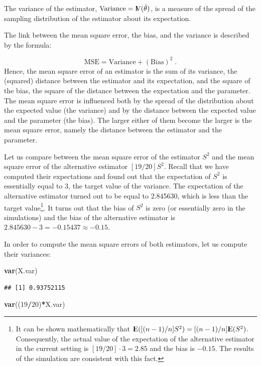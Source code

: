\documentclass[]{krantz}
\makeatletter
\newenvironment{Shaded}{\begin{snugshade}}{\end{snugshade}}
\newcommand{\KeywordTok}[1]{\textcolor[rgb]{0.13,0.29,0.53}{\textbf{#1}}}
\newcommand{\DecValTok}[1]{\textcolor[rgb]{0.00,0.00,0.81}{#1}}
\newcommand{\OperatorTok}[1]{\textcolor[rgb]{0.81,0.36,0.00}{\textbf{#1}}}
\newcommand{\NormalTok}[1]{#1}
\newcommand{\Expec}{{\rm I\kern-.3em E}}
\newcommand{\Var}{{\rm I\kern-.3em V}}
\newenvironment{kframe}{%
\medskip{}
\setlength{\fboxsep}{.8em}
 \def\at@end@of@kframe{}%
 \ifinner\ifhmode%
  \def\at@end@of@kframe{\end{minipage}}%
  \begin{minipage}{\columnwidth}%
 \fi\fi%
 \def\FrameCommand##1{\hskip\@totalleftmargin \hskip-\fboxsep
 \colorbox{shadecolor}{##1}\hskip-\fboxsep
     \hskip-\linewidth \hskip-\@totalleftmargin \hskip\columnwidth}%
 \MakeFramed {\advance\hsize-\width
   \@totalleftmargin\z@ \linewidth\hsize
   \@setminipage}}%
 {\par\unskip\endMakeFramed%
 \at@end@of@kframe}
\renewenvironment{Shaded}{\begin{kframe}}{\end{kframe}}
\theoremstyle{definition}
\theoremstyle{definition}
\theoremstyle{definition}
\theoremstyle{remark}
\makeatother
\begin{document}
The variance of the estimator, \(\mbox{Variance} = \Var(\hat \theta)\),
is a measure of the spread of the sampling distribution of the estimator
about its expectation.

The link between the mean square error, the bias, and the variance is
described by the formula:

\[\mbox{MSE} = \mbox{Variance} + (\mbox{Bias})^2\;.\] Hence, the mean
square error of an estimator is the sum of its variance, the (squared)
distance between the estimator and its expectation, and the square of
the bias, the square of the distance between the expectation and the
parameter. The mean square error is influenced both by the spread of the
distribution about the expected value (the variance) and by the distance
between the expected value and the parameter (the bias). The larger
either of them become the larger is the mean square error, namely the
distance between the estimator and the parameter.

Let us compare between the mean square error of the estimator \(S^2\)
and the mean square error of the alternative estimator \([19/20] S^2\).
Recall that we have computed their expectations and found out that the
expectation of \(S^2\) is essentially equal to 3, the target value of
the variance. The expectation of the alternative estimator turned out to
be equal to 2.845630, which is less than the target value\footnote{It
  can be shown mathematically that
  \(\Expec([(n-1)/n] S^2) = [(n-1)/n] \Expec(S^2)\). Consequently, the
  actual value of the expectation of the alternative estimator in the
  current setting is \([19/20]\cdot 3 = 2.85\) and the bias is
  \(-0.15\). The results of the simulation are consistent with this
  fact.}. It turns out that the bias of \(S^2\) is zero (or essentially
zero in the simulations) and the bias of the alternative estimator is
\(2.845630 - 3 = -0.15437 \approx -0.15\).

In order to compute the mean square errors of both estimators, let us
compute their variances:

\begin{Shaded}
\begin{Highlighting}[]
\KeywordTok{var}\NormalTok{(X.var)}
\end{Highlighting}
\end{Shaded}

\begin{verbatim}
## [1] 0.93752115
\end{verbatim}

\begin{Shaded}
\begin{Highlighting}[]
\KeywordTok{var}\NormalTok{((}\DecValTok{19}\OperatorTok{/}\DecValTok{20}\NormalTok{)}\OperatorTok{*}\NormalTok{X.var)}
\end{Highlighting}
\end{Shaded}
\end{document}
